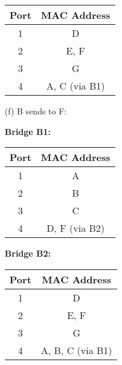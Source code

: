 \documentclass[11pt]{article}
\begin{document}
\begin{itemize}
\begin{table}[ht]
\begin{minipage}{.4\textwidth}
                \begin{tabular}{|c|c|}
                    \hline
                    Port & MAC Address   \\
                    \hline
                    1    & D             \\
                    2    & E, F          \\
                    3    & G             \\
                    4    & A, C (via B1) \\
                    \hline
                \end{tabular}
            \end{minipage}\label{tab:table-e}
        \end{table}



        \item[(f)] B sends to F:
            \begin{table}[ht]
            \centering
            \begin{minipage}{.4\textwidth}
                \centering
                \textbf{Bridge B1:}

                \begin{tabular}{|c|c|}
                    \hline
                    Port & MAC Address   \\
                    \hline
                    1    & A             \\
                    2    & B             \\
                    3    & C             \\
                    4    & D, F (via B2) \\
                    \hline
                \end{tabular}
            \end{minipage}
            \begin{minipage}{.4\textwidth}
                \centering
                \textbf{Bridge B2:}

                \begin{tabular}{|c|c|}
                    \hline
                    Port & MAC Address      \\
                    \hline
                    1    & D                \\
                    2    & E, F             \\
                    3    & G                \\
                    4    & A, B, C (via B1) \\
                    \hline
                \end{tabular}
            \end{minipage}\label{tab:table-f}
        \end{table}
    \end{itemize}
\end{document}
